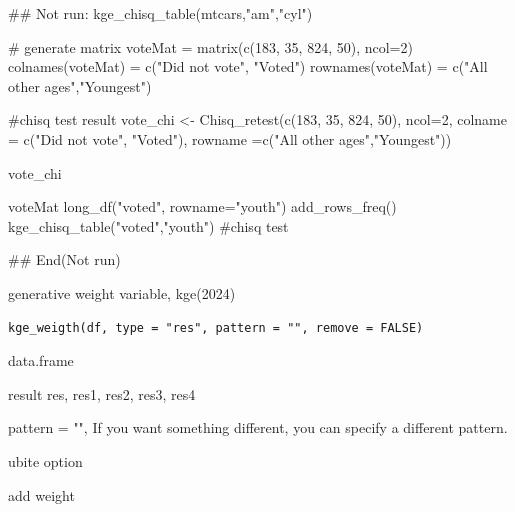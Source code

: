 \documentclass[a4paper]{book}
\begin{document}
%
\begin{Examples}
\begin{ExampleCode}

## Not run: 
kge_chisq_table(mtcars,"am","cyl")

# generate matrix
voteMat = matrix(c(183, 35, 824, 50), ncol=2)
colnames(voteMat) = c("Did not vote", "Voted")
rownames(voteMat) = c("All other ages","Youngest")

#chisq test result
vote_chi <- Chisq_retest(c(183, 35, 824, 50), ncol=2,
                        colname = c("Did not vote", "Voted"),
                         rowname =c("All other ages","Youngest"))

vote_chi

voteMat%
  long_df("voted", rowname="youth")%
  add_rows_freq() %
  kge_chisq_table("voted","youth")    #chisq test


## End(Not run)
\end{ExampleCode}
\end{Examples}
%
\begin{Description}
generative weight variable, kge(2024)
\end{Description}
%
\begin{Usage}
\begin{verbatim}
kge_weigth(df, type = "res", pattern = "", remove = FALSE)
\end{verbatim}
\end{Usage}
%
\begin{Arguments}
\begin{ldescription}
\item[\code{df}] data.frame

\item[\code{type}] result res, res1, res2, res3, res4

\item[\code{pattern}] pattern = "", If you want something different, you can specify a different pattern.

\item[\code{remove}] ubite option
\end{ldescription}
\end{Arguments}
%
\begin{Value}
add weight
\end{Value}
%
\end{document}
